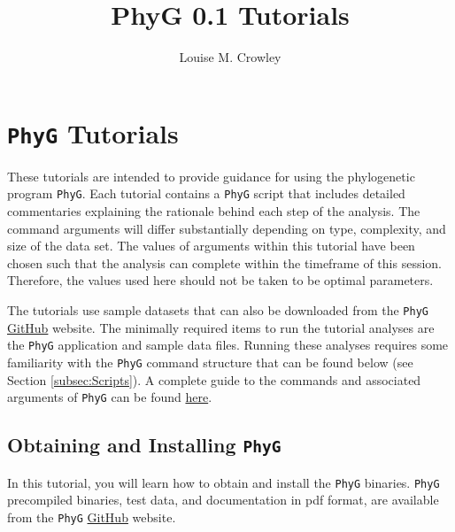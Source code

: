 \documentclass[11pt]{article}
\title{PhyG 0.1 Tutorials}
\author{Louise M. Crowley}
\newcommand{\phyg}{\texttt{PhyG} }
\begin{document}
\maketitle



\section{\phyg Tutorials}

These tutorials are intended to provide guidance for using the phylogenetic 
program \texttt{PhyG}. Each tutorial contains a \phyg script that includes 
detailed commentaries explaining the rationale behind each step of the analysis. 
The command arguments will differ substantially depending on type, complexity, 
and size of the data set. The values of arguments within this tutorial have been 
chosen such that the analysis can complete within the timeframe of this session.
Therefore, the values used here should not be taken to be optimal parameters. 

The tutorials use sample datasets that can also be downloaded from the \texttt{PhyG} 
\href{https://github.com/amnh/PhyGraph}{GitHub} website. The minimally required 
items to run the tutorial analyses are the \phyg application and sample data files. 
Running these analyses requires some familiarity with the \phyg command structure 
that can be found below (see Section \ref{subsec:Scripts}). A complete guide to the
commands and associated arguments of \phyg can be found 
\href{https://github.com/amnh/PhyGraph}{here}.

\subsection{Obtaining and Installing \phyg}
\label{subsec:Installation}

In this tutorial, you will learn how to obtain and install the \phyg binaries. \phyg 
precompiled binaries, test data, and documentation in pdf format, are available 
from the \phyg \href{https://github.com/amnh/PhyGraph}{GitHub} website. 
\end{document}

